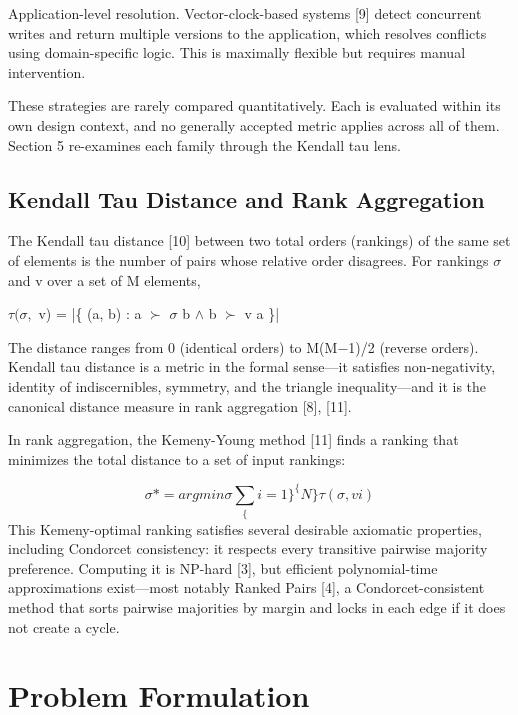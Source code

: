 \documentclass[11pt]{article}
\begin{document}
Application-level resolution. Vector-clock-based systems [9] detect concurrent writes and return multiple versions to the application, which resolves conflicts using domain-specific logic. This is maximally flexible but requires manual intervention.

These strategies are rarely compared quantitatively. Each is evaluated within its own design context, and no generally accepted metric applies across all of them. Section 5 re-examines each family through the Kendall tau lens.

\subsection{Kendall Tau Distance and Rank Aggregation}
The Kendall tau distance [10] between two total orders (rankings) of the same set of elements is the number of pairs whose relative order disagrees. For rankings $\sigma $ and v over a set of M elements,

$\tau (\sigma ,$ v) = |\{ (a, b) : a $\succ $ $\sigma $ b $\wedge $ b $\succ $ v a \}|

The distance ranges from 0 (identical orders) to M(M−1)/2 (reverse orders). Kendall tau distance is a metric in the formal sense—it satisfies non-negativity, identity of indiscernibles, symmetry, and the triangle inequality—and it is the canonical distance measure in rank aggregation [8], [11].

In rank aggregation, the Kemeny-Young method [11] finds a ranking that minimizes the total distance to a set of input rankings:

\[ \sigma * = arg min \sigma  \sum _\{i=1\}^\{N\} \tau (\sigma , v i) \]
This Kemeny-optimal ranking satisfies several desirable axiomatic properties, including Condorcet consistency: it respects every transitive pairwise majority preference. Computing it is NP-hard [3], but efficient polynomial-time approximations exist—most notably Ranked Pairs [4], a Condorcet-consistent method that sorts pairwise majorities by margin and locks in each edge if it does not create a cycle.

\section{Problem Formulation}
\end{document}
